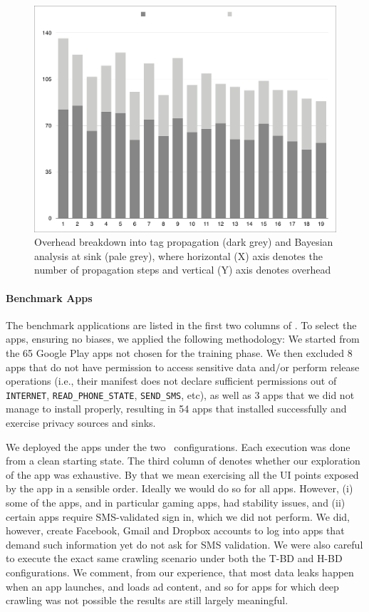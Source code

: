 \begin{figure}
\includegraphics[width=\columnwidth]{OverheadDiagram.pdf}
\caption{\label{Fi:overhead}Overhead breakdown into tag propagation (dark grey) and Bayesian analysis at sink (pale grey), where horizontal (X) axis denotes the number of propagation steps and vertical (Y) axis denotes overhead}
\end{figure}



\paragraph{Benchmark Apps} The benchmark applications are listed in the first two columns of . To select the apps, ensuring no biases, we applied the following methodology: We started from the 65 Google Play apps not chosen for the training phase. We then excluded 8 apps that do not have permission to access sensitive data and/or perform release operations (i.e., their manifest does not declare sufficient permissions out of {\tt INTERNET}, {\tt READ\_PHONE\_STATE}, {\tt SEND\_SMS}, etc), as well as 3 apps that we did not manage to install properly, resulting in 54 apps that installed successfully and exercise privacy sources and sinks.
 
We deployed the apps under the two \Tool\ configurations. Each execution was done from a clean starting state. 
The third column of  denotes whether our exploration of the app was exhaustive. By that we mean exercising all the UI points exposed by the app in a sensible order. Ideally we would do so for all apps. However, (i) some of the apps, and in particular gaming apps, had stability issues, and (ii) certain apps require SMS-validated sign in, which we did not perform. We did, however, create Facebook, Gmail and Dropbox accounts to log into apps that demand such information yet do not ask for SMS validation. We were also careful to execute the exact same crawling scenario under both the T-BD and H-BD configurations. We comment, from our experience, that most data leaks happen when an app launches, and loads ad content, and so for apps for which deep crawling was not possible the results are still largely meaningful. 
 
